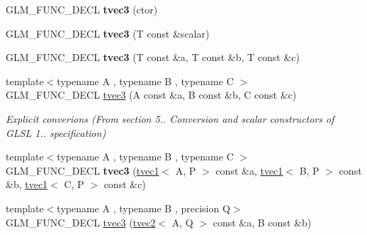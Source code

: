 \begin{DoxyCompactItemize}
\item 
\hypertarget{structglm_1_1tvec3_aff8d373dbcc5b03c6aef3092474489d0}{G\-L\-M\-\_\-\-F\-U\-N\-C\-\_\-\-D\-E\-C\-L {\bfseries tvec3} (ctor)}\label{structglm_1_1tvec3_aff8d373dbcc5b03c6aef3092474489d0}

\item 
\hypertarget{structglm_1_1tvec3_af567074633620732a368685a7eb451f7}{G\-L\-M\-\_\-\-F\-U\-N\-C\-\_\-\-D\-E\-C\-L {\bfseries tvec3} (T const \&scalar)}\label{structglm_1_1tvec3_af567074633620732a368685a7eb451f7}

\item 
\hypertarget{structglm_1_1tvec3_a9c3e064c51d3d9ee1cb5353348a99654}{G\-L\-M\-\_\-\-F\-U\-N\-C\-\_\-\-D\-E\-C\-L {\bfseries tvec3} (T const \&a, T const \&b, T const \&c)}\label{structglm_1_1tvec3_a9c3e064c51d3d9ee1cb5353348a99654}

\item 
\hypertarget{structglm_1_1tvec3_a0b681461de215371b4f8bacbf514bd40}{{\footnotesize template$<$typename A , typename B , typename C $>$ }\\G\-L\-M\-\_\-\-F\-U\-N\-C\-\_\-\-D\-E\-C\-L \hyperlink{structglm_1_1tvec3_a0b681461de215371b4f8bacbf514bd40}{tvec3} (A const \&a, B const \&b, C const \&c)}\label{structglm_1_1tvec3_a0b681461de215371b4f8bacbf514bd40}

\begin{DoxyCompactList}\small\item\em Explicit converions (From section 5.. Conversion and scalar constructors of G\-L\-S\-L 1.. specification) \end{DoxyCompactList}\item 
\hypertarget{structglm_1_1tvec3_aa785ff9b6da14ac85b793f0af36ff852}{{\footnotesize template$<$typename A , typename B , typename C $>$ }\\G\-L\-M\-\_\-\-F\-U\-N\-C\-\_\-\-D\-E\-C\-L {\bfseries tvec3} (\hyperlink{structglm_1_1tvec1}{tvec1}$<$ A, P $>$ const \&a, \hyperlink{structglm_1_1tvec1}{tvec1}$<$ B, P $>$ const \&b, \hyperlink{structglm_1_1tvec1}{tvec1}$<$ C, P $>$ const \&c)}\label{structglm_1_1tvec3_aa785ff9b6da14ac85b793f0af36ff852}

\item 
\hypertarget{structglm_1_1tvec3_ad2542f4353388c57283dd78e932853ba}{{\footnotesize template$<$typename A , typename B , precision Q$>$ }\\G\-L\-M\-\_\-\-F\-U\-N\-C\-\_\-\-D\-E\-C\-L \hyperlink{structglm_1_1tvec3_ad2542f4353388c57283dd78e932853ba}{tvec3} (\hyperlink{structglm_1_1tvec2}{tvec2}$<$ A, Q $>$ const \&a, B const \&b)}\label{structglm_1_1tvec3_ad2542f4353388c57283dd78e932853ba}


\end{DoxyCompactItemize}
